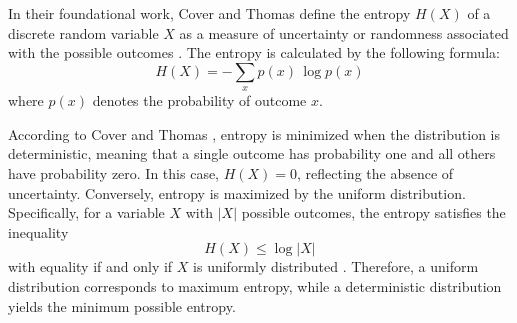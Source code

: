In their foundational work, Cover and Thomas define the entropy $H(X)$ of a discrete random variable $X$ as a measure of uncertainty or randomness associated with the possible outcomes \cite[Section 2.1]{Entropy}. The entropy is calculated by the following formula:
\[
H(X) = - \sum_x p(x)\, \log p(x)
\]
where $p(x)$ denotes the probability of outcome $x$.

According to Cover and Thomas \cite[p.~14]{Entropy}, entropy is minimized when the distribution is deterministic, meaning that a single outcome has probability one and all others have probability zero. In this case, $H(X)=0$, reflecting the absence of uncertainty. Conversely, entropy is maximized by the uniform distribution. Specifically, for a variable $X$ with $|X|$ possible outcomes, the entropy satisfies the inequality
\[
H(X) \leq \log |X| 
\]
with equality if and only if $X$ is uniformly distributed \cite[Theorem 2.6.4, p.~27]{Entropy}. Therefore, a uniform distribution corresponds to maximum entropy, while a deterministic distribution yields the minimum possible entropy.

